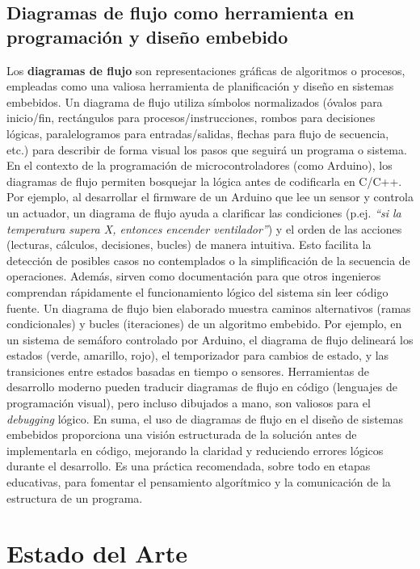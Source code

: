 \documentclass{article}
\begin{document}
\subsection{Diagramas de flujo como herramienta en programación y diseño embebido}
Los \textbf{diagramas de flujo} son representaciones gráficas de algoritmos o procesos, empleadas como una valiosa herramienta de planificación y diseño en sistemas embebidos. Un diagrama de flujo utiliza símbolos normalizados (óvalos para inicio/fin, rectángulos para procesos/instrucciones, rombos para decisiones lógicas, paralelogramos para entradas/salidas, flechas para flujo de secuencia, etc.) para describir de forma visual los pasos que seguirá un programa o sistema.\cite{Tarsini2024} En el contexto de la programación de microcontroladores (como Arduino), los diagramas de flujo permiten bosquejar la lógica antes de codificarla en C/C++. Por ejemplo, al desarrollar el firmware de un Arduino que lee un sensor y controla un actuador, un diagrama de flujo ayuda a clarificar las condiciones (p.ej. \textit{“si la temperatura supera X, entonces encender ventilador”}) y el orden de las acciones (lecturas, cálculos, decisiones, bucles) de manera intuitiva. Esto facilita la detección de posibles casos no contemplados o la simplificación de la secuencia de operaciones.\cite{Tarsini2024} Además, sirven como documentación para que otros ingenieros comprendan rápidamente el funcionamiento lógico del sistema sin leer código fuente. Un diagrama de flujo bien elaborado muestra caminos alternativos (ramas condicionales) y bucles (iteraciones) de un algoritmo embebido. Por ejemplo, en un sistema de semáforo controlado por Arduino, el diagrama de flujo delineará los estados (verde, amarillo, rojo), el temporizador para cambios de estado, y las transiciones entre estados basadas en tiempo o sensores. Herramientas de desarrollo moderno pueden traducir diagramas de flujo en código (lenguajes de programación visual), pero incluso dibujados a mano, son valiosos para el \textit{debugging} lógico. En suma, el uso de diagramas de flujo en el diseño de sistemas embebidos proporciona una visión estructurada de la solución antes de implementarla en código, mejorando la claridad y reduciendo errores lógicos durante el desarrollo.\cite{Tarsini2024} Es una práctica recomendada, sobre todo en etapas educativas, para fomentar el pensamiento algorítmico y la comunicación de la estructura de un programa.
\section{Estado del Arte}
\end{document}
